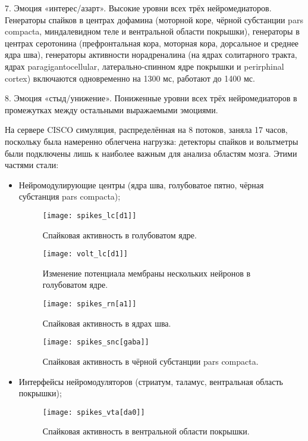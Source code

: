 7. Эмоция «интерес/азарт». Высокие уровни всех трёх нейромедиаторов. Генераторы спайков в центрах дофамина (моторной коре, чёрной субстанции pars compacta, миндалевидном теле и вентральной области покрышки), генераторы в центрах серотонина (префронтальная кора, моторная кора, дорсальное и среднее ядра шва), генераторы активности норадреналина (на ядрах солитарного тракта, ядрах paragigantocellular, латерально-спинном ядре покрышки и perirphinal cortex) включаются одновременно на 1300 мс, работают до 1400 мс.

8. Эмоция «стыд/унижение». Пониженные уровни всех трёх нейромедиаторов в промежутках между остальными выражаемыми эмоциями.

На сервере CISCO симуляция, распределённая на 8 потоков, заняла 17 часов, поскольку была намеренно облегчена нагрузка: детекторы спайков и вольтметры были подключены лишь к наиболее важным для анализа областям мозга. Этими частями стали: \begin{itemize}
\item Нейромодулирующие центры (ядра шва, голубоватое пятно, чёрная субстанция pars compacta);


\begin{figure}
	\centering
	\texttt{[image: spikes\_lc[d1]]}
	\caption{Спайковая активность в голубоватом ядре.}
	\label{fig:spikes_lc[d1]}
\end{figure}

\begin{figure}
	\centering
	\texttt{[image: volt\_lc[d1]]}
	\caption{Изменение потенциала мембраны нескольких нейронов в голубоватом ядре.}
	\label{fig:volt_lc[d1]}
\end{figure}

\begin{figure}
	\centering
	\texttt{[image: spikes\_rn[a1]]}
	\caption{Спайковая активность в ядрах шва.}
	\label{fig:spikes_rn[a1]}
\end{figure}

\begin{figure}
	\centering
	\texttt{[image: spikes\_snc[gaba]]}
	\caption{Спайковая активность в чёрной субстанции pars compacta.}
	\label{fig:sero600voltage}
\end{figure}

\item Интерфейсы нейромодуляторов (стриатум, таламус, вентральная область покрышки);


\begin{figure}
	\centering
	\texttt{[image: spikes\_vta[da0]]}
	\caption{Спайковая активность в вентральной области покрышки.}
	\label{fig:spikes_vta}
\end{figure}


\end{itemize}
